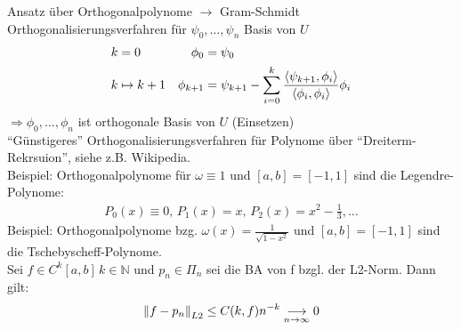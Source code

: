 Ansatz über Orthogonalpolynome $\rightarrow$ Gram-Schmidt Orthogonalisierungsverfahren
für $\psi_0,\ldots,\psi_n$ Basis von $U$
\begin{align*}
  k &= 0 & \phi_0 &= \psi_0\\
  k &\mapsto k+1 & \phi_{k+1} &= \psi_{k+1} - \sum\limits_{i=0}^{k}{\frac{\left\langle \psi_{k+1}, \phi_i \right\rangle}{\left\langle \phi_i, \phi_i \right\rangle}\phi_i}
\end{align*}
$\Rightarrow \phi_0,\ldots,\phi_n$ ist orthogonale Basis von $U$ (Einsetzen)\\
``Günstigeres'' Orthogonalisierungsverfahren für Polynome über ``Dreiterm-Rekrsuion'', siehe z.B. Wikipedia.\\
Beispiel: Orthogonalpolynome für $\omega \equiv 1$ und $[a,b]=[-1,1]$ sind die Legendre-Polynome:
\begin{align*}
  P_0(x)\equiv 0, \, P_1(x)=x, \, P_2(x)=x^2 - \frac{1}{3},\ldots
\end{align*}
Beispiel: Orthogonalpolynome bzg. $\omega(x)=\frac{1}{\sqrt{1-x^2}}$ und $[a,b]=[-1,1]$ sind die Tschebyscheff-Polynome.\\
 Sei $f \in C^k[a,b]\, k \in \mathbb{N}$ und $p_n \in \Pi_n$ sei die BA von f bzgl. der L2-Norm. Dann gilt:
\begin{align*}
  \left\lVert f-p_n \right\rVert_{L2} \leq C(k,f)n^{-k} \underset{n \to \infty}{\longrightarrow} 0
\end{align*}

